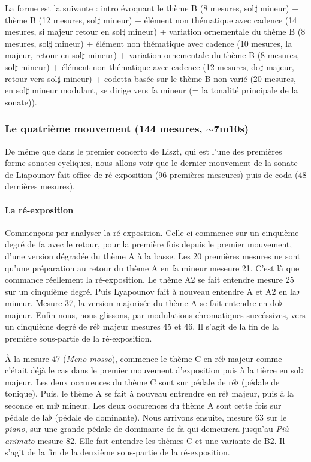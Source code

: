 La forme est la suivante : intro évoquant le thème B (8 mesures, sol$\sharp$ mineur) + thème B (12 mesures, sol$\sharp$ mineur) + élément non thématique avec cadence (14 mesures, si majeur retour en sol$\sharp$ mineur) + variation ornementale du thème B (8 mesures, sol$\sharp$ mineur) + élément non thématique avec cadence (10 mesures, la majeur, retour en sol$\sharp$ mineur) + variation ornementale du thème B (8 mesures, sol$\sharp$ mineur) + élément non thématique avec cadence (12 mesures, do$\sharp$ majeur, retour vers sol$\sharp$ mineur) + codetta basée sur le thème B non varié (20 mesures, en sol$\sharp$ mineur modulant, se dirige vers fa mineur (= la tonalité principale de la sonate)).

\subsubsection*{Le quatrième mouvement (144 mesures, $\sim$7m10s)}

De même que dans le premier concerto de Liszt, qui est l'une des premières forme-sonates cycliques, nous allons voir que le dernier mouvement de la sonate de Liapounov fait office de ré-exposition (96 premières meseures) puis de coda (48 dernières mesures).

\paragraph{La ré-exposition}

Commençons par analyser la ré-exposition. Celle-ci commence sur un cinquième degré de fa avec le retour, pour la première fois depuis le premier mouvement, d'une version dégradée du thème A à la basse. Les 20 premières mesures ne sont qu'une préparation au retour du thème A en fa mineur meseure 21. C'est là que commance réellement la ré-exposition. Le thème A2 se fait entendre mesure 25 sur un cinquième degré. Puis Lyapounov fait à nouveau entendre A et A2 en la$\flat$ mineur. Mesure 37, la version majorisée du thème A se fait entendre en do$\flat$ majeur. Enfin nous, nous glissons, par modulations chromatiques succéssives, vers un cinquième degré de ré$\flat$ majeur mesures 45 et 46. Il s'agit de la fin de la première sous-partie de la ré-exposition.

À la mesure 47 (\emph{Meno mosso}), commence le thème C en ré$\flat$ majeur comme c'était déjà le cas dans le premier mouvement d'exposition puis à la tièrce en sol$\flat$ majeur. Les deux occurences du thème C sont sur pédale de ré$\flat$ (pédale de tonique). Puis, le thème A se fait à nouveau entrendre en ré$\flat$ majeur, puis à la seconde en mi$\flat$ mineur. Les deux occurences du thème A sont cette fois sur pédale de la$\flat$ (pédale de dominante).
Nous arrivons ensuite, mesure 63 sur le \emph{piano}, sur une grande pédale de dominante de fa qui demeurera jusqu'au \emph{Più animato} mesure 82. Elle fait entendre les thèmes C et une variante de B2. Il s'agit de la fin de la deuxième sous-partie de la ré-exposition.

